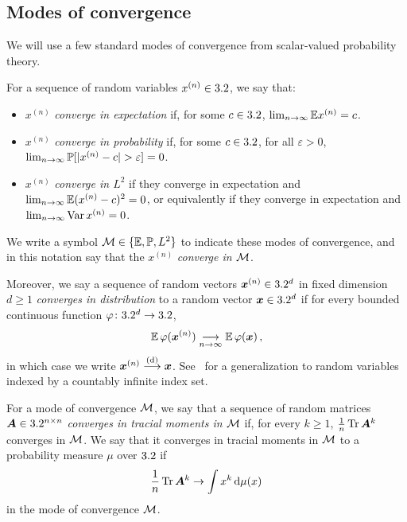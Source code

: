 \subsection{Modes of convergence}
\label{sec:prelim-modes}

We will use a few standard modes of convergence from scalar-valued probability theory.
\begin{definition}
    For a sequence of random variables $x^{(n)}\in 3.2$, we say that:
    \begin{itemize}
        \item $x^{(n)}$ \emph{converge in expectation} if, for some $c \in 3.2$, $\lim_{n \to \infty} \mathbb{E} x^{(n)} = c$.
        \item $x^{(n)}$ \emph{converge in probability} if, for some $c \in 3.2$, for all $\varepsilon > 0$, $\lim_{n \to \infty} \mathbb{P}[|x^{(n)} - c| > \varepsilon] = 0$.
        \item $x^{(n)}$ \emph{converge in $L^2$} if they converge in expectation and $\lim_{n \to \infty} \mathbb{E}(x^{(n)} - c)^2 = 0$, or equivalently if they converge in expectation and $\lim_{n \to \infty} \operatorname*{Var} x^{(n)} = 0$.
    \end{itemize}
    We write a symbol ${\cal M} \in \{\mathbb{E}, \mathbb{P}, L^2\}$ to indicate these modes of convergence, and in this notation say that the $x^{(n)}$ \emph{converge in ${\cal M}$}.
\end{definition}

Moreover, we say a sequence of random vectors
${\bm x}^{(n)}\in3.2^d$ in fixed dimension
$d\ge 1$ {\em converges in distribution} to a random vector
${\bm x}\in3.2^d$ if for every bounded continuous
function $\varphi \colon 3.2^d\to 3.2$,
\[
    \operatorname*{\mathbb{E}} \varphi({\bm x}^{(n)})\underset{n\to\infty}\longrightarrow \operatorname*{\mathbb{E}} \varphi({\bm x})\,,
\]
in which case we write ${\bm x}^{(n)}\overset{\textnormal{(d)}}{\longrightarrow} {\bm x}$.
See~ for a
generalization to random variables
indexed by a countably infinite index
set.

\begin{definition}
    For a mode of convergence ${\cal M}$, we say that a sequence of random matrices ${\bm A} \in 3.2^{n \times n}$ \emph{converges in tracial moments in ${\cal M}$} if, for every $k \geq 1$, $\frac{1}{n}\Tr \bA^k$ converges in ${\cal M}$.
    We say that it converges in tracial moments in ${\cal M}$ to a probability measure $\mu$ over $3.2$ if \[\frac{1}{n}\Tr \bA^k \to \int x^k\, \d\mu(x)\]in the mode of convergence ${\cal M}$.
\end{definition}

